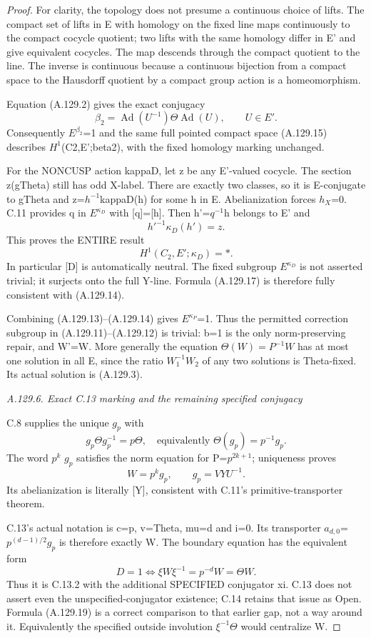 \begin{proof}
For clarity, the topology does not presume a continuous choice of lifts. The compact set of lifts in E with homology on the fixed line maps continuously to the compact cocycle quotient; two lifts with the same homology differ in E' and give equivalent cocycles. The map descends through the compact quotient to the line. The inverse is continuous because a continuous bijection from a compact space to the Hausdorff quotient by a compact group action is a homeomorphism.

Equation (A.129.2) gives the exact conjugacy
\[
 \beta_2=\operatorname{Ad}(U^{-1})\Theta\operatorname{Ad}(U),
 \qquad U\in E'.
\tag{A.129.16}
\]
Consequently \(E^{\beta_2}\)=1 and the same full pointed compact space (A.129.15) describes \(H^1\)(C2,E';beta2), with the fixed homology marking unchanged.

For the NONCUSP action kappaD, let z be any E'-valued cocycle. The section z(gTheta) still has odd X-label. There are exactly two classes, so it is E-conjugate to gTheta and z=\(h^{-1}\)kappaD(h) for some h in E. Abelianization forces \(h_X\)=0. C.11 provides q in \(E^{\kappa_D}\) with [q]=[h]. Then h'=\(q^{-1}\)h belongs to E' and
\[
 h'^{-1}\kappa_D(h')=z.
\]
This proves the ENTIRE result
\[
 \boxed{H^1(C_2,E';\kappa_D)=*.}
\tag{A.129.17}
\]
In particular [D] is automatically neutral. The fixed subgroup \(E^{\kappa_D}\) is not asserted trivial; it surjects onto the full Y-line. Formula (A.129.17) is therefore fully consistent with (A.129.14).

Combining (A.129.13)--(A.129.14) gives \(E^{\kappa_P}\)=1. Thus the permitted correction subgroup in (A.129.11)--(A.129.12) is trivial: b=1 is the only norm-preserving repair, and W'=W. More generally the equation \(\Theta(W)=P^{-1}W\) has at most one solution in all E, since the ratio \(W_1^{-1}W_2\) of any two solutions is Theta-fixed. Its actual solution is (A.129.3).

\par\smallskip\noindent\emph{A.129.6. Exact C.13 marking and the remaining specified conjugacy}

C.8 supplies the unique \(g_p\) with
\[
 g_p\Theta g_p^{-1}=p\Theta,
 \quad\text{equivalently }\Theta(g_p)=p^{-1}g_p.
\]
The word \(p^k\) \(g_p\) satisfies the norm equation for P=\(p^{2k+1}\); uniqueness proves
\[
 \boxed{W=p^kg_p,\qquad g_p=VYU^{-1}.}
\tag{A.129.18}
\]
Its abelianization is literally [Y], consistent with C.11's primitive-transporter theorem.

C.13's actual notation is c=p, v=Theta, mu=d and i=0. Its transporter \(a_{d,0}\)=\(p^{(d-1)/2}\)\(g_p\) is therefore exactly W. The boundary equation has the equivalent form
\[
 \boxed{D=1\iff \xi W\xi^{-1}=p^{-d}W=\Theta W.}
\tag{A.129.19}
\]
Thus it is C.13.2 with the additional SPECIFIED conjugator xi. C.13 does not assert even the unspecified-conjugator existence; C.14 retains that issue as Open. Formula (A.129.19) is a correct comparison to that earlier gap, not a way around it. Equivalently the specified outside involution \(\xi^{-1}\Theta\) would centralize W.


\end{proof}
